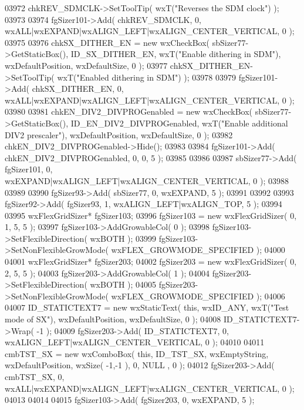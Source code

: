 \begin{DoxyCode}
03972     chkREV_SDMCLK->SetToolTip( wxT(\textcolor{stringliteral}{"Reverses the SDM clock"}) );
03973     
03974     fgSizer101->Add( chkREV_SDMCLK, 0, wxALL|wxEXPAND|wxALIGN\_LEFT|wxALIGN\_CENTER\_VERTICAL, 0 );
03975     
03976     chkSX_DITHER_EN = \textcolor{keyword}{new} wxCheckBox( sbSizer77->GetStaticBox(), ID_SX_DITHER_EN, wxT(\textcolor{stringliteral}{"Enable dithering in
       SDM"}), wxDefaultPosition, wxDefaultSize, 0 );
03977     chkSX_DITHER_EN->SetToolTip( wxT(\textcolor{stringliteral}{"Enabled dithering in SDM"}) );
03978     
03979     fgSizer101->Add( chkSX_DITHER_EN, 0, wxALL|wxEXPAND|wxALIGN\_LEFT|wxALIGN\_CENTER\_VERTICAL, 0 );
03980     
03981     chkEN_DIV2_DIVPROGenabled = \textcolor{keyword}{new} wxCheckBox( sbSizer77->GetStaticBox(), 
      ID_EN_DIV2_DIVPROGenabled, wxT(\textcolor{stringliteral}{"Enable additional DIV2 prescaler"}), wxDefaultPosition, wxDefaultSize, 0 );
03982     chkEN_DIV2_DIVPROGenabled->Hide();
03983     
03984     fgSizer101->Add( chkEN_DIV2_DIVPROGenabled, 0, 0, 5 );
03985     
03986     
03987     sbSizer77->Add( fgSizer101, 0, wxEXPAND|wxALIGN\_LEFT|wxALIGN\_CENTER\_VERTICAL, 0 );
03988     
03989     
03990     fgSizer93->Add( sbSizer77, 0, wxEXPAND, 5 );
03991     
03992     
03993     fgSizer92->Add( fgSizer93, 1, wxALIGN\_LEFT|wxALIGN\_TOP, 5 );
03994     
03995     wxFlexGridSizer* fgSizer103;
03996     fgSizer103 = \textcolor{keyword}{new} wxFlexGridSizer( 0, 1, 5, 5 );
03997     fgSizer103->AddGrowableCol( 0 );
03998     fgSizer103->SetFlexibleDirection( wxBOTH );
03999     fgSizer103->SetNonFlexibleGrowMode( wxFLEX\_GROWMODE\_SPECIFIED );
04000     
04001     wxFlexGridSizer* fgSizer203;
04002     fgSizer203 = \textcolor{keyword}{new} wxFlexGridSizer( 0, 2, 5, 5 );
04003     fgSizer203->AddGrowableCol( 1 );
04004     fgSizer203->SetFlexibleDirection( wxBOTH );
04005     fgSizer203->SetNonFlexibleGrowMode( wxFLEX\_GROWMODE\_SPECIFIED );
04006     
04007     ID_STATICTEXT7 = \textcolor{keyword}{new} wxStaticText( \textcolor{keyword}{this}, wxID\_ANY, wxT(\textcolor{stringliteral}{"Test mode of SX"}), wxDefaultPosition, 
      wxDefaultSize, 0 );
04008     ID_STATICTEXT7->Wrap( -1 );
04009     fgSizer203->Add( ID_STATICTEXT7, 0, wxALIGN\_LEFT|wxALIGN\_CENTER\_VERTICAL, 0 );
04010     
04011     cmbTST_SX = \textcolor{keyword}{new} wxComboBox( \textcolor{keyword}{this}, ID_TST_SX, wxEmptyString, wxDefaultPosition, wxSize( -1,-1 ), 0, NULL
      , 0 ); 
04012     fgSizer203->Add( cmbTST_SX, 0, wxALL|wxEXPAND|wxALIGN\_LEFT|wxALIGN\_CENTER\_VERTICAL, 0 );
04013     
04014     
04015     fgSizer103->Add( fgSizer203, 0, wxEXPAND, 5 );

\end{DoxyCode}
